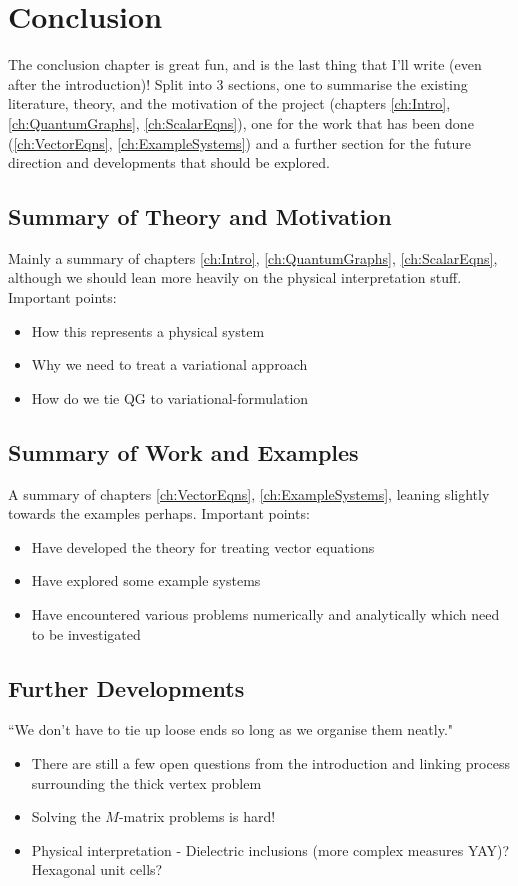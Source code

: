 \chapter{Conclusion} \label{ch:Conclusion}
The conclusion chapter is great fun, and is the last thing that I'll write (even after the introduction)!
Split into 3 sections, one to summarise the existing literature, theory, and the motivation of the project (chapters \ref{ch:Intro}, \ref{ch:QuantumGraphs}, \ref{ch:ScalarEqns}), one for the work that has been done (\ref{ch:VectorEqns}, \ref{ch:ExampleSystems}) and a further section for the future direction and developments that should be explored.

\section{Summary of Theory and Motivation}
Mainly a summary of chapters \ref{ch:Intro}, \ref{ch:QuantumGraphs}, \ref{ch:ScalarEqns}, although we should lean more heavily on the physical interpretation stuff.
Important points:
\begin{itemize}
	\item How this represents a physical system
	\item Why we need to treat a variational approach
	\item How do we tie QG to variational-formulation
\end{itemize}

\section{Summary of Work and Examples}
A summary of chapters \ref{ch:VectorEqns}, \ref{ch:ExampleSystems}, leaning slightly towards the examples perhaps.
Important points:
\begin{itemize}
	\item Have developed the theory for treating vector equations
	\item Have explored some example systems
	\item Have encountered various problems numerically and analytically which need to be investigated
\end{itemize}

\section{Further Developments}
``We don't have to tie up loose ends so long as we organise them neatly."
\begin{itemize}
	\item There are still a few open questions from the introduction and linking process surrounding the thick vertex problem
	\item Solving the $M$-matrix problems is hard!
	\item Physical interpretation - Dielectric inclusions (more complex measures YAY)? Hexagonal unit cells?
\end{itemize}
